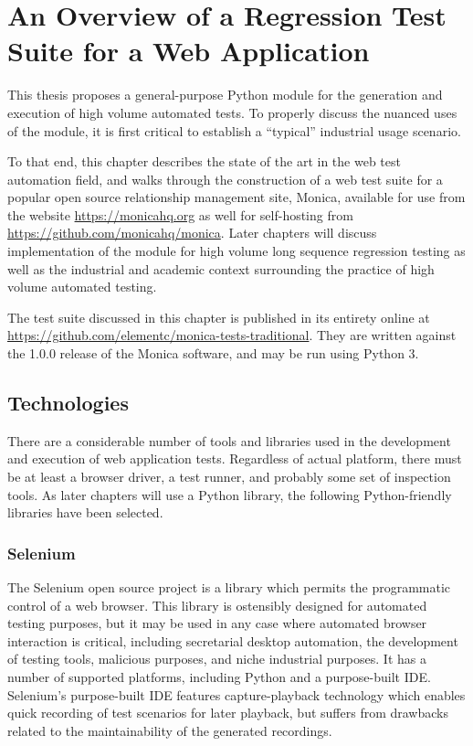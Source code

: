 \chapter{An Overview of a Regression Test Suite for a Web Application}
This thesis proposes a general-purpose Python module for the generation and execution of high volume automated tests. To properly discuss the nuanced uses of the module, it is first critical to establish a ``typical'' industrial usage scenario.

To that end, this chapter describes the state of the art in the web test automation field, and walks through the construction of a web test suite for a popular open source relationship management site, Monica, available for use from the website \url{https://monicahq.org} as well for self-hosting from \url{https://github.com/monicahq/monica}. Later chapters will discuss implementation of the module for high volume long sequence regression testing as well as the industrial and academic context surrounding the practice of high volume automated testing.

The test suite discussed in this chapter is published in its entirety online at \url{https://github.com/elementc/monica-tests-traditional}. They are written against the 1.0.0 release of the Monica software, and may be run using Python 3.

\section{Technologies}
There are a considerable number of tools and libraries used in the development and execution of web application tests.\citep{kaur2013comparative} Regardless of actual platform, there must be at least a browser driver, a test runner, and probably some set of inspection tools. As later chapters will use a Python library, the following Python-friendly libraries have been selected.

\subsection{Selenium}
The Selenium open source project is a library which permits the programmatic control of a web browser.\citep{holmes2006automating} This library is ostensibly designed for automated testing purposes\citep{razak2011agile}, but it may be used in any case where automated browser interaction is critical, including secretarial desktop automation, the development of testing tools, malicious purposes, and niche industrial purposes.\citep{kongsli2007security} It has a number of supported platforms, including Python and a purpose-built IDE.\citep{bruns2009web} Selenium's purpose-built IDE features capture-playback technology which enables quick recording of test scenarios for later playback, but suffers from drawbacks related to the maintainability of the generated recordings.\citep{leotta2013capture}

